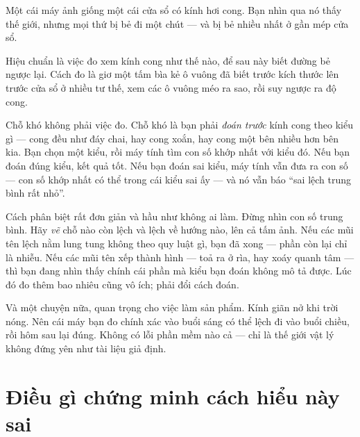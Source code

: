\documentclass[../../vslam.tex]{subfiles}
\begin{document}
\begin{dongian}
Một cái máy ảnh giống một cái cửa sổ có kính hơi cong. Bạn nhìn qua nó thấy thế giới, nhưng mọi thứ bị bẻ đi một chút --- và bị bẻ nhiều nhất ở gần mép cửa sổ.

Hiệu chuẩn là việc đo xem kính cong như thế nào, để sau này biết đường bẻ ngược lại. Cách đo là giơ một tấm bìa kẻ ô vuông đã biết trước kích thước lên trước cửa sổ ở nhiều tư thế, xem các ô vuông méo ra sao, rồi suy ngược ra độ cong.

Chỗ khó không phải việc đo. Chỗ khó là bạn phải \emph{đoán trước} kính cong theo kiểu gì --- cong đều như đáy chai, hay cong xoắn, hay cong một bên nhiều hơn bên kia. Bạn chọn một kiểu, rồi máy tính tìm con số khớp nhất với kiểu đó. Nếu bạn đoán đúng kiểu, kết quả tốt. Nếu bạn đoán sai kiểu, máy tính vẫn đưa ra con số --- con số khớp nhất có thể trong cái kiểu sai ấy --- và nó vẫn báo ``sai lệch trung bình rất nhỏ''.

Cách phân biệt rất đơn giản và hầu như không ai làm. Đừng nhìn con số trung bình. Hãy \emph{vẽ} chỗ nào còn lệch và lệch về hướng nào, lên cả tấm ảnh. Nếu các mũi tên lệch nằm lung tung không theo quy luật gì, bạn đã xong --- phần còn lại chỉ là nhiễu. Nếu các mũi tên xếp thành hình --- toả ra ở rìa, hay xoáy quanh tâm --- thì bạn đang nhìn thấy chính cái phần mà kiểu bạn đoán không mô tả được. Lúc đó đo thêm bao nhiêu cũng vô ích; phải đổi cách đoán.

Và một chuyện nữa, quan trọng cho việc làm sản phẩm. Kính giãn nở khi trời nóng. Nên cái máy bạn đo chính xác vào buổi sáng có thể lệch đi vào buổi chiều, rồi hôm sau lại đúng. Không có lỗi phần mềm nào cả --- chỉ là thế giới vật lý không đứng yên như tài liệu giả định.

\end{dongian}

\section{Điều gì chứng minh cách hiểu này sai}
\end{document}
